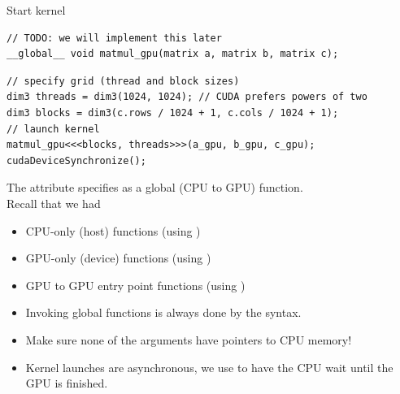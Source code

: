 \begin{frame}[fragile]{Start kernel}
    \begin{verbatim}
// TODO: we will implement this later
__global__ void matmul_gpu(matrix a, matrix b, matrix c);
    \end{verbatim}
    \begin{verbatim}
// specify grid (thread and block sizes)
dim3 threads = dim3(1024, 1024); // CUDA prefers powers of two
dim3 blocks = dim3(c.rows / 1024 + 1, c.cols / 1024 + 1);
// launch kernel
matmul_gpu<<<blocks, threads>>>(a_gpu, b_gpu, c_gpu);
cudaDeviceSynchronize();
    \end{verbatim}

     {
        The  attribute specifies  as a global (CPU to GPU) function. \\
        Recall that we had
        \begin{itemize}
            \item CPU-only (host) functions (using )
            \item GPU-only (device) functions (using )
            \item GPU to GPU entry point functions (using )
        \end{itemize}
    }
     {
        \begin{itemize}
            \item Invoking global functions is always done by the  syntax.
            \item Make sure none of the arguments have pointers to CPU memory!
            \item Kernel launches are asynchronous, we use  to have the CPU wait until the GPU is finished.
        \end{itemize}
    }


\end{frame}
